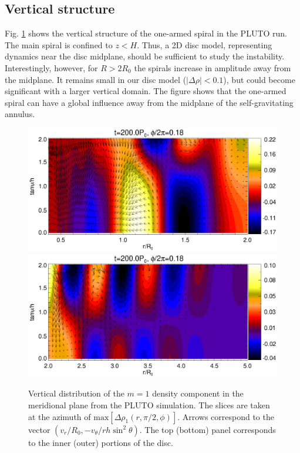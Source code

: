 \subsection{Vertical structure}
Fig. \ref{3d_rz} shows the vertical structure of the one-armed
spiral in the PLUTO run. The main spiral is confined to $z < H$. Thus,
a 2D disc model, representing dynamics near the disc midplane, 
should be sufficient to study the instability. Interestingly, however, for $R>2R_0$ the
spirals  increase in amplitude away from the midplane. It remains
small in our disc model ($|\Delta\rho| < 0.1$), but could become 
significant with a larger vertical domain. The figure shows that 
the one-armed spiral can have a global influence away from the
midplane of the self-gravitating annulus.

\begin{figure}
  \includegraphics[scale=0.47,clip=true,trim=0cm 0.79cm 0cm
  0cm]{figures/pdisk_rz_023_sg.ps}  
  \includegraphics[scale=0.47,clip=true,trim=0cm 0cm 0cm
  0.64cm]{figures/pdisk_rz_023_nsg.ps}  
  \caption{Vertical distribution of the $m=1$ density component in the meridional plane from the 
    PLUTO simulation. The slices are taken at the azimuth of   
    $\mathrm{max}[\Delta\rho_1(r,\pi/2,\phi)]$. Arrows correspond to the vector 
    $(v_r/R_0,-v_\theta/rh\sin^2{\theta})$. The top (bottom) panel corresponds
    to the inner (outer) portions of the disc. 
    \label{3d_rz}} 
\end{figure}   

